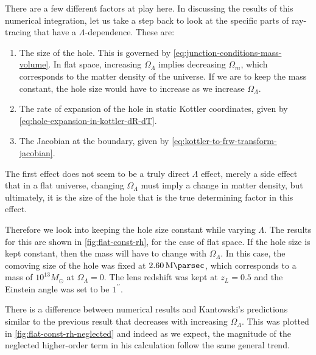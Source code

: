 There are a few different factors at play here. In discussing the results of this numerical integration, let us take a step back to look at the specific parts of ray-tracing that have a $\Lambda$-dependence. These are:
\begin{enumerate}
  \item The size of the hole. This is governed by \autoref{eq:junction-conditions-mass-volume}. In flat space, increasing $\Omega_{\Lambda}$ implies decreasing $\Omega_{m}$, which corresponds to the matter density of the universe. If we are to keep the mass constant, the hole size would have to increase as we increase $\Omega_{\Lambda}$. 
  \item The rate of expansion of the hole in static Kottler coordinates, given by \autoref{eq:hole-expansion-in-kottler-dR-dT}.  
  \item The Jacobian at the boundary, given by \autoref{eq:kottler-to-frw-transform-jacobian}.
\end{enumerate}

The first effect does not seem to be a truly direct $\Lambda$ effect, merely a side effect that in a flat universe, changing $\Omega_{\Lambda}$ must imply a change in matter density, but ultimately, it is the size of the hole that is the true determining factor in this effect. 

Therefore we look into keeping the hole size constant while varying $\Lambda$. The results for this are shown in \autoref{fig:flat-const-rh}, for the case of flat space. If the hole size is kept constant, then the mass will have to change with $\Omega_{\Lambda}$. In this case, the comoving size of the hole was fixed at $\SI{2.60}{\mega\parsec}$, which corresponds to a mass of $10^{13}M_{\odot}$ at $\Omega_{\Lambda} = 0$. The lens redshift was kept at $z_L = 0.5$ and the Einstein angle was set to be $1^{\prime\prime}$.

There is a difference between numerical results and Kantowski's predictions similar to the previous result that decreases with increasing $\Omega_{\Lambda}$. This was plotted in \autoref{fig:flat-const-rh-neglected} and indeed as we expect, the magnitude of the neglected higher-order term in his calculation follow the same general trend.

